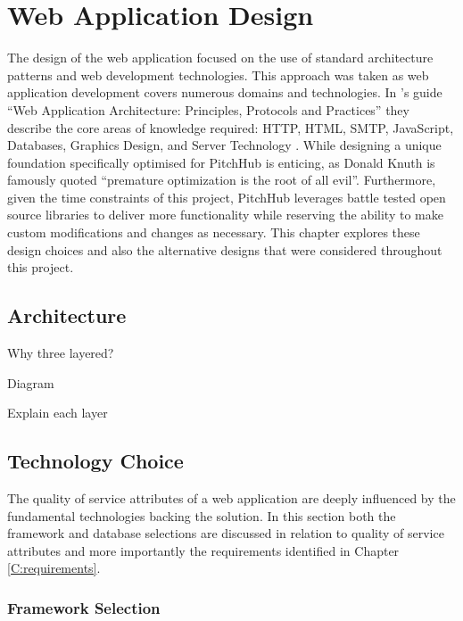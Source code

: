 
\chapter{Web Application Design}
The design of the web application focused on the use of standard architecture patterns and web development technologies. This approach was taken as web application development covers numerous domains and technologies. In \citeauthor{shklar2009web}'s guide ``Web Application Architecture: Principles, Protocols and Practices'' they describe the core areas of knowledge required: HTTP, HTML, SMTP, JavaScript, Databases, Graphics Design, and Server Technology \cite{shklar2009web}. While designing a unique foundation specifically optimised for PitchHub is enticing, as Donald Knuth is famously quoted ``premature optimization is the root of all evil''. Furthermore, given the time constraints of this project, PitchHub leverages battle tested open source libraries to deliver more functionality while reserving the ability to make custom modifications and changes as necessary. This chapter explores these design choices and also the alternative designs that were considered throughout this project.

\section{Architecture}

Why three layered?

Diagram

Explain each layer

\section{Technology Choice}

The quality of service attributes of a web application are deeply influenced by the fundamental technologies backing the solution. In this section both the framework and database selections are discussed in relation to quality of service attributes and more importantly the requirements identified in Chapter \ref{C:requirements}.

\subsection{Framework Selection}

